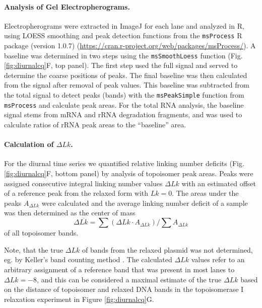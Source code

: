 \documentclass[10pt,a4]{article}
\def\cite#1{\hypersetup{citecolor=Teal}\citep{#1}} %
\begin{document}
\paragraph{Analysis of Gel Electropherograms.}
Electropherograms were extracted in ImageJ for each lane and analyzed
in R, using LOESS smoothing and peak detection functions from the
\texttt{msProcess} R package (version 1.0.7)
(\url{https://cran.r-project.org/web/packages/msProcess/}). A baseline
was determined in two steps using the \texttt{msSmoothLoess} function
(Fig. \ref{fig:diurnalcq}F, top panel).  The first step used the full
signal and served to determine the coarse positions of peaks.  The
final baseline was then calculated from the signal after removal of
peak values. This baseline was subtracted from the total signal to
detect peaks (bands) with the \texttt{msPeakSimple} function from
\texttt{msProcess} and calculate peak areas.  For the total RNA
analysis, the baseline signal stems from mRNA and rRNA degradation
fragments, and was used to calculate ratios of rRNA peak areas to the
``baseline'' area.

\paragraph{Calculation of $\Delta Lk$.}
For the diurnal time series we quantified relative linking number
deficits (Fig. \ref{fig:diurnalcq}F, bottom panel) by analysis of
topoisomer peak areas.  Peaks were assigned consecutive
integral linking number values $\Delta Lk$ with an estimated offset of
a reference peak from the relaxed form with $Lk=0$. The areas under
the peaks $A_{\Delta Lk}$ were calculated and the average linking
number deficit of a sample was then determined as the center of mass
\begin{equation}
  \label{eq:dlk}
  \Delta \overline{Lk} = \sum{(\Delta Lk \cdot
    A_{\Delta Lk})}/\sum{A_{\Delta Lk}}
\end{equation}
of all topoisomer bands.

Note, that the true $\Delta Lk$ of bands from the relaxed plasmid was
not determined, eg. by Keller's band counting method
\cite{Keller1975b}.  The calculated $\Delta Lk$ values refer to an
arbitrary assignment of a reference band that was present in most
lanes to $\Delta Lk=-8$, and this can be considered a maximal estimate
of the true $\Delta Lk$ based on the distance of topoisomer and
relaxed DNA bands in the topoisomerase I relaxation experiment in
Figure \ref{fig:diurnalcq}G.

\setlength{\bibsep}{0.0pt}
\begin{spacing}{0.9}
  
\end{spacing}
\end{document}
